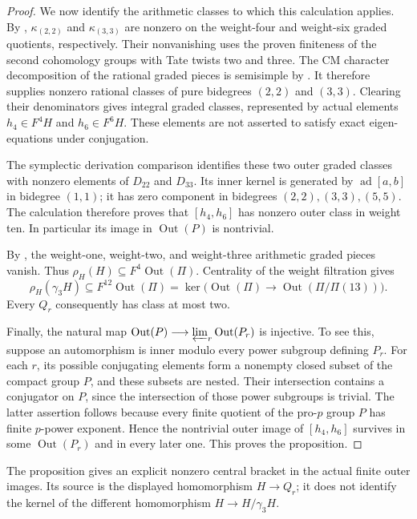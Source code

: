 \begin{proof}
We now identify the arithmetic classes to which this calculation
applies.  By \cite[Theorem 2.8 and Lemma 2.10, p.~9]{Ishii},
\(\kappa_{(2,2)}\) and \(\kappa_{(3,3)}\) are nonzero on the
weight-four and weight-six graded quotients, respectively.
Their nonvanishing uses the proven finiteness of the
second cohomology groups with Tate twists two and three.
The CM character decomposition of the rational graded pieces
is semisimple by \cite[Proposition 2.2]{Ishii}.
It therefore supplies nonzero rational classes of pure
bidegrees \((2,2)\) and \((3,3)\).
Clearing their denominators gives integral graded classes,
represented by actual elements \(h_4\in F^4H\) and
\(h_6\in F^6H\).
These elements are not asserted to satisfy exact eigen-equations
under conjugation.

The symplectic derivation comparison
\cite[Proposition 3.3(4), pp.~12--14]{IshiiLie} identifies these
two outer graded classes with nonzero elements of \(D_{22}\)
and \(D_{33}\).  Its inner kernel is generated by
\(\operatorname{ad}[a,b]\) in bidegree \((1,1)\);
it has zero component in bidegrees \((2,2),(3,3),(5,5)\).
The calculation therefore proves that
\([h_4,h_6]\) has nonzero outer class in weight ten.
In particular its image in \(\operatorname{Out}(P)\) is nontrivial.

By \cite[Proposition 2.2(1)]{Ishii}, the weight-one,
weight-two, and weight-three arithmetic graded pieces vanish.
Thus \(\rho_H(H)\subseteq F^4\operatorname{Out}(\Pi)\).
Centrality of the weight filtration gives
\[
 \rho_H(\gamma_3H)\subseteq F^{12}\operatorname{Out}(\Pi)
       =\ker\bigl(\operatorname{Out}(\Pi)\longrightarrow
                              \operatorname{Out}(\Pi/\Pi(13))\bigr).
\]
Every \(Q_r\) consequently has class at most two.

Finally, the natural map
\(\operatorname{Out}(P)\longrightarrow
 \varprojlim_r\operatorname{Out}(P_r)\) is injective.
To see this, suppose an automorphism is inner modulo every
power subgroup defining \(P_r\).  For each \(r\), its possible
conjugating elements form a nonempty closed subset of the
compact group \(P\), and these subsets are nested.
Their intersection contains a conjugator on \(P\), since
the intersection of those power subgroups is trivial.
The latter assertion follows because every finite quotient of
the pro-\(p\) group \(P\) has finite \(p\)-power exponent.
Hence the nontrivial outer image of \([h_4,h_6]\) survives
in some \(\operatorname{Out}(P_r)\) and in every later one.
This proves the proposition.
\end{proof}

The proposition gives an explicit nonzero central bracket in
the actual finite outer images.  Its source is the displayed
homomorphism \(H\to Q_r\); it does not identify the kernel of
the different homomorphism \(H\to H/\gamma_3H\).
